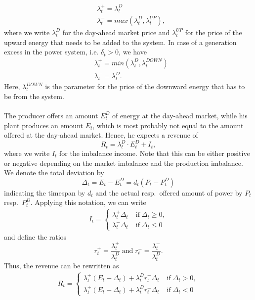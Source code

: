\begin{align*}
	&\lambda_{t}^{+}=\lambda_{t}^{D}
	\\ &\lambda_{t}^{-}=max\left(\lambda_{t}^{D}, \lambda_{t}^{UP}\right),
\end{align*}
where we write $\lambda_{t}^{D}$ for the day-ahead market price and $\lambda_{t}^{UP}$ for the price of the upward energy that needs to be added to the system. In case of a generation excess in the power system, i.e. $\delta_{t}>0$, we have 
\begin{align*}
	&\lambda_{t}^{+}=min\left(\lambda_{t}^{D}, \lambda_{t}^{DOWN}\right)
	\\ &\lambda_{t}^{-}=\lambda_{t}^{D}.
\end{align*} 
Here, $\lambda_{t}^{DOWN}$ is the parameter for the price of the downward energy that has to be  from the system. 
\\ \\
The producer offers an amount $E_{t}^{D}$ of energy at the day-ahead market, while his plant produces an emount $E_{t}$, which is most probably not equal to the amount offered at the day-ahead market. Hence, he expects a revenue of
\begin{equation*}
	R_{t}=\lambda_{t}^{D}\cdot E_{t}^{D} + I_{t},
\end{equation*}
where we write $I_{t}$ for the imbalance income. Note that this can be either positive or negative depending on the market imbalance and the production imbalance. We denote the total deviation by
\begin{equation*}
	\Delta_{t}=E_{t}-E_{t}^{D}=d_{t}\left(P_{t}-P_{t}^{D}\right)
\end{equation*}
indicating the timespan by $d_{t}$ and the actual resp.\ offered amount of power by $P_{t}$ resp.\ $P_{t}^{D}$. Applying this notation, we can write
\begin{align*}
	I_{t}= \begin{cases}
		\lambda_{t}^{+}\Delta_{t} &\mathrm{\; if \;} \Delta_{t} \geq 0,
		\\ \lambda_{t}^{-}\Delta_{t} &\mathrm{\; if \;} \Delta_{t}\leq 0
	\end{cases}
\end{align*}
and define the ratios 
\begin{equation*}
	r_{t}^{+}= \frac{\lambda_{t}^{+}}{\lambda_{t}^{D}} \mathrm{\; and \;} r_{t}^{-}=\frac{\lambda_{t}^{-}}{\lambda_{t}^{D}}.
\end{equation*}
Thus, the revenue can be rewritten as
\begin{align*}
	R_{t}= \begin{cases}
		\lambda_{t}^{+}\left(E_{t}-\Delta_{t}\right)+\lambda_{t}^{D}r_{t}^	{+}\Delta_{t} &\mathrm{\; if \;} \Delta_{t} > 0,
		\\ \lambda_{t}^{+}\left(E_{t}-\Delta_{t}\right)+\lambda_{t}^{D}r_{t}^	{-}\Delta_{t} &\mathrm{\; if \;} \Delta_{t}< 0
	\end{cases}
\end{align*} 
